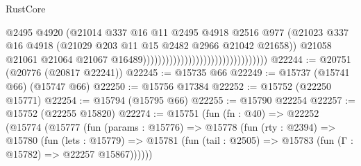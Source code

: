 \begin{lexlean}{RustCore}
\begin{coremodule}
                                                                    @2495
                                                                    @4920
                                                                    (@21014
                                                                      @337
                                                                      @16
                                                                      @11
                                                                      @2495
                                                                      @4918
                                                                      @2516
                                                                      @977
                                                                      (@21023
                                                                        @337
                                                                        @16
                                                                        @4918
                                                                        (@21029
                                                                          @203
                                                                          @11
                                                                          @15
                                                                          @2482
                                                                          @2966
                                                                          @21042
                                                                          @21658))
                                                                      @21058
                                                                      @21061
                                                                      @21064
                                                                      @21067
                                                                      @16489)))))))))))))))))))))))))))))))))
@22244 := @20751 (@20776 (@20817 @22241))
@22245 := @15735 @66
@22249 := @15737 (@15741 @66) (@15747 @66)
@22250 := @15756 @17384
@22252 := @15752 (@22250 @15771)
@22254 := @15794 (@15795 @66)
@22255 := @15790 @22254
@22257 := @15752 (@22255 @15820)
@22274 := @15751
    (fun (fn : @40) =>
    @22252
      (@15774
        (@15777
          (fun (params : @15776) =>
          @15778
            (fun (rty : @2394) =>
            @15780
              (fun (lets : @15779) =>
              @15781 (fun (tail : @2505) => @15783 (fun (Γ : @15782) => @22257 @15867))))))

\end{coremodule}
\end{lexlean}
